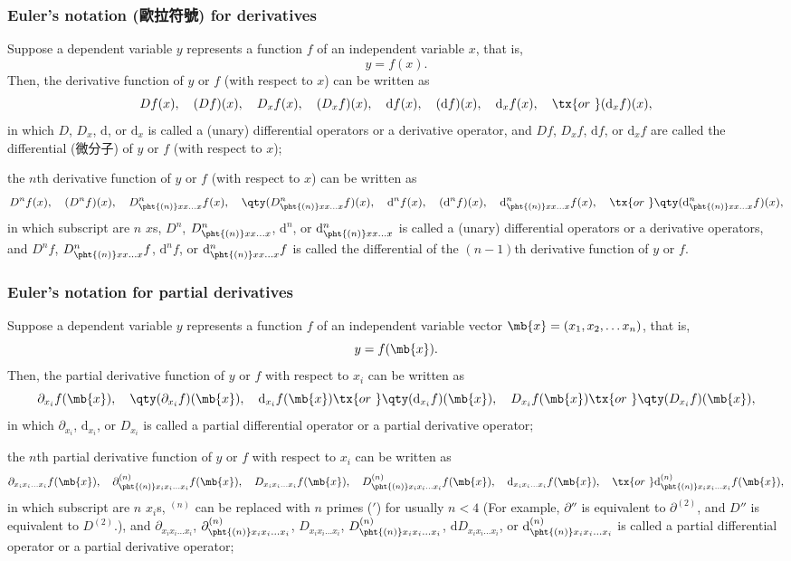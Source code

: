 \documentclass[a4paper,12pt]{report}
\begin{document}
\begin{itemize}
\begin{itemize}
\subsubsection{Euler's notation (歐拉符號) for derivatives}
Suppose a dependent variable $y$ represents a function $f$ of an independent variable $x$, that is,
\[y=f(x).\]
Then, the derivative function of $y$ or $f$ (with respect to $x$) can be written as
\[Df(x),\quad(Df)(x),\quad D_xf(x),\quad (D_xf)(x),\quad \mathrm{d}f(x),\quad(\mathrm{d}f)(x),\quad \mathrm{d}_xf(x),\quad \tx{or\ }(\mathrm{d}_xf)(x),\]
in which $D$, $D_x$, $\mathrm{d}$, or $\mathrm{d}_x$ is called a (unary) differential operators or a derivative operator, and  $Df$, $D_xf$, $\mathrm{d}f$, or $\mathrm{d}_xf$ are called the differential (微分子) of $y$ or $f$ (with respect to $x$);

the $n$th derivative function of $y$ or $f$ (with respect to $x$) can be written as
\[D^nf(x),\quad(D^nf)(x),\quad D^n_{\pht{(n)}xx\dots x}f(x),\quad\qty(D^n_{\pht{(n)}xx\dots x}f)(x),\quad \mathrm{d}^nf(x),\quad(\mathrm{d}^nf)(x),\quad \mathrm{d}^n_{\pht{(n)}xx\dots x}f(x),\quad \tx{or\ }\qty(\mathrm{d}^n_{\pht{(n)}xx\dots x}f)(x),\]
in which subscript are $n$ $x$s, $D^n$, $D^n_{\pht{(n)}xx\dots x}$, $\mathrm{d}^n$, or $\mathrm{d}^n_{\pht{(n)}xx\dots x}$ is called a (unary) differential operators or a derivative operators, and $D^nf$, $D^n_{\pht{(n)}xx\dots x}f$, $\mathrm{d}^nf$, or $\mathrm{d}^n_{\pht{(n)}xx\dots x}f$ is called the differential of the $(n-1)$th derivative function of $y$ or $f$.
\subsubsection{Euler's notation for partial derivatives}
Suppose a dependent variable $y$ represents a function $f$ of an independent variable vector $\mb{x}=(x_1,x_2,\dots x_n)$, that is,
\[y=f(\mb{x}).\]
Then, the partial derivative function of $y$ or $f$ with respect to $x_i$ can be written as
\[\partial_{x_i}f(\mb{x}),\quad \qty(\partial_{x_i}f)(\mb{x}),\quad \mathrm{d}_{x_i}f(\mb{x})\tx{or\ }\qty(\mathrm{d}_{x_i}f)(\mb{x}),\quad D_{x_i}f(\mb{x})\tx{or\ }\qty(D_{x_i}f)(\mb{x}),\]
in which $\partial_{x_i}$, $\mathrm{d}_{x_i}$, or $D_{x_i}$ is called a partial differential operator or a partial derivative operator;

the $n$th partial derivative function of $y$ or $f$ with respect to $x_i$ can be written as
\[\partial_{x_ix_i\dots  x_i}f(\mb{x}),\quad\partial^{(n)}_{\pht{(n)}x_ix_i\dots  x_i}f(\mb{x}),\quad D_{x_ix_i\dots  x_i}f(\mb{x}),\quad D^{(n)}_{\pht{(n)}x_ix_i\dots  x_i}f(\mb{x}),\quad \mathrm{d}_{x_ix_i\dots  x_i}f(\mb{x}),\quad\tx{or\ }\mathrm{d}^{(n)}_{\pht{(n)}x_ix_i\dots  x_i}f(\mb{x}),\]
in which subscript are $n$ $x_i$s, $^{(n)}$ can be replaced with $n$ primes ($'$) for usually $n<4$ (For example, $\partial''$ is equivalent to $\partial^{(2)}$, and $D''$ is equivalent to $D^{(2)}$.), and $\partial_{x_ix_i\dots  x_i}$, $\partial^{(n)}_{\pht{(n)}x_ix_i\dots  x_i}$, $D_{x_ix_i\dots  x_i}$, $D^{(n)}_{\pht{(n)}x_ix_i\dots  x_i}$, $\mathrm{d}D_{x_ix_i\dots  x_i}$, or $\mathrm{d}^{(n)}_{\pht{(n)}x_ix_i\dots  x_i}$ is called a partial differential operator or a partial derivative operator;


\end{itemize}
\end{itemize}
\end{document}
